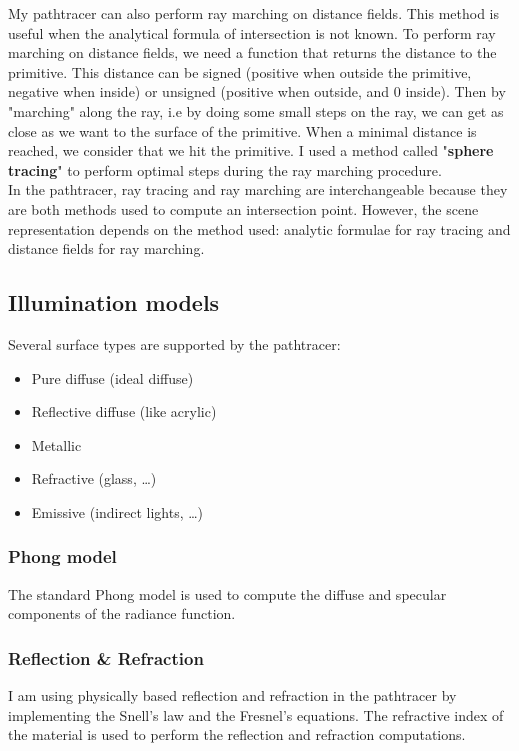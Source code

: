 \documentclass[a4paper,10pt]{article}
\begin{document}
My pathtracer can also perform ray marching on distance fields. This method is useful when the analytical formula of intersection is not known. To perform ray marching on distance fields, we need a function that returns the distance to the primitive. This distance can be signed (positive when outside the primitive, negative when inside) or unsigned (positive when outside, and 0 inside). Then by "marching" along the ray, i.e by doing some small steps on  the ray, we can get as close as we want to the surface of the primitive. When a minimal distance is reached, we consider that we hit the primitive. I used a method called "\textbf{sphere tracing}" to perform optimal steps during the ray marching procedure. \\

\noindent
In the pathtracer, ray tracing and ray marching are interchangeable because they are both methods used to compute an intersection point. However, the scene representation depends on the method used: analytic formulae for ray tracing and distance fields for ray marching.

\subsection{Illumination models}

Several surface types are supported by the pathtracer:
\begin{itemize}
	\item Pure diffuse (ideal diffuse)
	\item Reflective diffuse (like acrylic)
	\item Metallic
	\item Refractive (glass, \ldots)
	\item Emissive (indirect lights, \ldots)
\end{itemize}

\subsubsection{Phong model}

The standard Phong model is used to compute the diffuse and specular components of the radiance function.

\subsubsection{Reflection \& Refraction}

I am using physically based reflection and refraction in the pathtracer by implementing the Snell's law and the Fresnel's equations. The refractive index of the material is used to perform the reflection and refraction computations.\\
\end{document}
